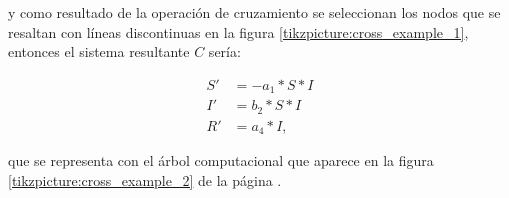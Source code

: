 

y como resultado de la operación de cruzamiento se seleccionan los nodos que se resaltan con líneas discontinuas en la figura \ref{tikzpicture:cross_example_1}, entonces el sistema resultante $C$ sería:

\begin{align*}
    S' & = - a_1 * S * I \\
    I' & = b_2 * S * I   \\
    R' & = a_4 * I,
\end{align*}

que se representa con el árbol computacional que aparece en la figura \ref{tikzpicture:cross_example_2} de la página \pageref{tikzpicture:cross_example_2}.

